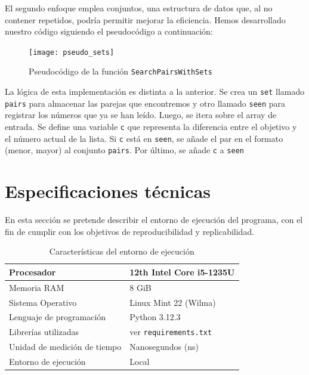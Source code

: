 \documentclass[a4paper, titlepage]{article}
\begin{document}
El segundo enfoque emplea conjuntos, una estructura de datos que, al no contener repetidos, podría permitir mejorar la eficiencia. Hemos desarrollado nuestro código siguiendo el pseudocódigo a continuación:

\begin{figure}[h]


\texttt{[image: pseudo\_sets]}

\caption{Pseudocódigo de la función \texttt{SearchPairsWithSets}}

\end{figure}

La lógica de esta implementación es distinta a la anterior. Se crea un \texttt{set} llamado \texttt{pairs} para almacenar las parejas que encontremos y otro llamado \texttt{seen} para registrar los números que ya se han leído. Luego, se itera sobre el array de entrada. Se define una variable \texttt{c} que representa la diferencia entre el objetivo y el número actual de la lista. Si \texttt{c} está en \texttt{seen}, se añade el par en el formato (menor, mayor) al conjunto \texttt{pairs}. Por último, se añade \texttt{c} a \texttt{seen}


\section{Especificaciones técnicas}

En esta sección se pretende describir el entorno de ejecución del programa, con el fin de cumplir con los objetivos de reproducibilidad y replicabilidad.

\begin{table}
\centering
\begin{tabular}{|l|l|}
\hline
Procesador &  12th Intel Core i5-1235U\\  \hline
Memoria RAM &  8 GiB\\  \hline
Sistema Operativo& Linux Mint 22 (Wilma) \\ \hline
Lenguaje de programación & Python 3.12.3\\ \hline
Librerías utilizadas & ver \texttt{requirements.txt}\\ \hline 
Unidad de medición de tiempo & Nanosegundos (ns)\\ \hline
Entorno de ejecución & Local \\\hline
\end{tabular}
\caption{Características del entorno de ejecución}
\label{maquina}
\end{table}
\end{document}
